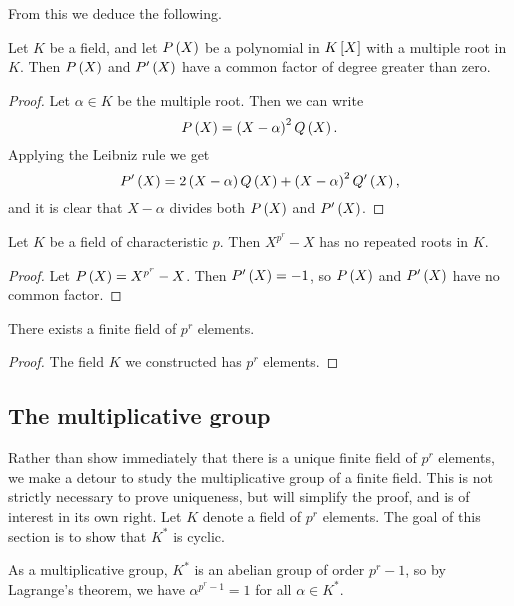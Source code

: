 From this we deduce the following.

\begin{lemma}
Let $ K $ be a field, and let $ P\br{X} $ be a polynomial in $ K\sbr{X} $ with a multiple root in $ K $. Then $ P\br{X} $ and $ P'\br{X} $ have a common factor of degree greater than zero.
\end{lemma}

\begin{proof}
Let $ \alpha \in K $ be the multiple root. Then we can write
$$ P\br{X} = \br{X - \alpha}^2Q\br{X}. $$
Applying the Leibniz rule we get
$$ P'\br{X} = 2\br{X - \alpha}Q\br{X} + \br{X - \alpha}^2Q'\br{X}, $$
and it is clear that $ X - \alpha $ divides both $ P\br{X} $ and $ P'\br{X} $.
\end{proof}

\begin{corollary}
Let $ K $ be a field of characteristic $ p $. Then $ X^{p^r} - X $ has no repeated roots in $ K $.
\end{corollary}

\begin{proof}
Let $ P\br{X} = X^{p^r} - X $. Then $ P'\br{X} = -1 $, so $ P\br{X} $ and $ P'\br{X} $ have no common factor.
\end{proof}

\begin{corollary}
There exists a finite field of $ p^r $ elements.
\end{corollary}

\begin{proof}
The field $ K $ we constructed has $ p^r $ elements.
\end{proof}

\pagebreak

\subsection{The multiplicative group}


Rather than show immediately that there is a unique finite field of $ p^r $ elements, we make a detour to study the multiplicative group of a finite field. This is not strictly necessary to prove uniqueness, but will simplify the proof, and is of interest in its own right. Let $ K $ denote a field of $ p^r $ elements. The goal of this section is to show that $ K^* $ is cyclic.

\begin{note*}
As a multiplicative group, $ K^* $ is an abelian group of order $ p^r - 1 $, so by Lagrange's theorem, we have $ \alpha^{p^r - 1} = 1 $ for all $ \alpha \in K^* $.
\end{note*}

